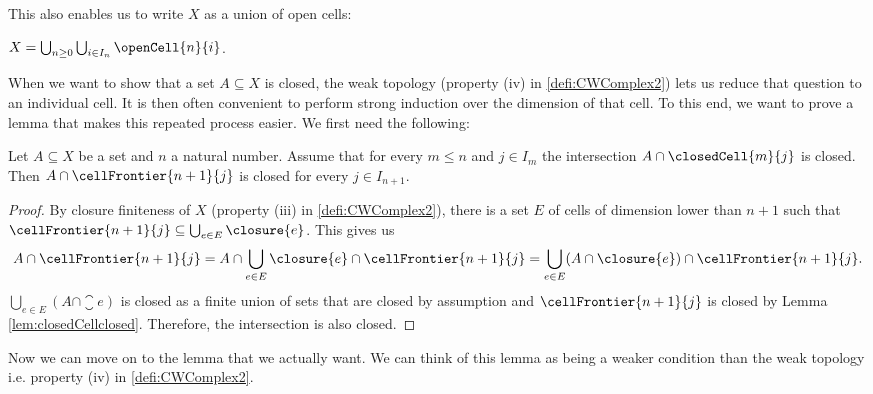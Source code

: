 This also enables us to write $X$ as a union of open cells:

\begin{cor} \label{cor:complexeqopencells}
    $X = \bigcup_{n \ge 0}\bigcup_{i \in I_n} \openCell{n}{i}$.
    \href{https://github.com/scholzhannah/CWComplexes/blob/7be4872a05b534011cc969eb5b80a4b7f0bf57e2/CWcomplexes/Definition.lean#L324-L325}{\faExternalLink}
\end{cor}

When we want to show that a set $A \subseteq X$ is closed, the weak topology (property (iv) in \ref{defi:CWComplex2}) lets us reduce that question to an individual cell.
It is then often convenient to perform strong induction over the dimension of that cell.
To this end, we want to prove a lemma that makes this repeated process easier.
We first need the following:

\begin{lem}\label{lem:inductioncellFrontierclosed}
    Let $A \subseteq X$ be a set and $n$ a natural number.
    Assume that for every $m \le n$ and $j \in I_m$ the intersection $A \cap \closedCell{m}{j}$ is closed.
    Then $A \cap \cellFrontier{n + 1}{j}$ is closed for every $j \in I_{n + 1}$. \href{https://github.com/scholzhannah/CWComplexes/blob/7be4872a05b534011cc969eb5b80a4b7f0bf57e2/CWcomplexes/Definition.lean#L387-L401}{\faExternalLink}
\end{lem}
\begin{proof}
    By closure finiteness of $X$ (property (iii) in \ref{defi:CWComplex2}), there is a set $E$ of cells of dimension lower than $n + 1$ such that $\cellFrontier{n + 1}{j} \subseteq \bigcup_{e \in E}\closure{e}$.
    This gives us
    \[A \cap \cellFrontier{n + 1}{j} = A \cap \bigcup_{e \in E}\closure{e} \cap \cellFrontier{n + 1}{j} = \bigcup_{e \in E}(A \cap \closure{e}) \cap \cellFrontier{n + 1}{j}.\]
    $\bigcup_{e \in E}(A \cap \closure{e})$ is closed as a finite union of sets that are closed by assumption and $\cellFrontier{n + 1}{j}$ is closed by Lemma \ref{lem:closedCellclosed}. 
    Therefore, the intersection is also closed.
\end{proof}

Now we can move on to the lemma that we actually want.
We can think of this lemma as being a weaker condition than the weak topology i.e. property (iv) in \ref{defi:CWComplex2}.

